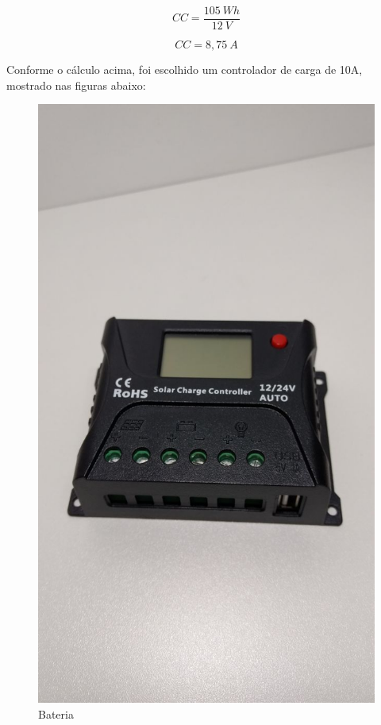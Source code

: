\begin{equation}
CC=\frac{105~Wh}{12~V}
\end{equation}

\begin{equation}
CC=8,75~A
\end{equation}

Conforme o cálculo acima, foi escolhido um controlador de carga de 10A, mostrado nas figuras abaixo:

\begin{figure}[h]
\centering
\includegraphics[keepaspectratio=true,scale=0.15]{figuras/controlador1}
\caption{Bateria}
\label{Figura3}
\end{figure}

